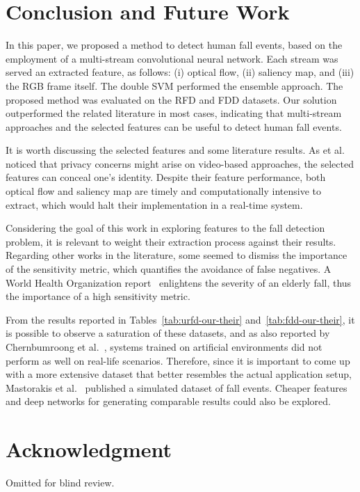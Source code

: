 \documentclass[conference]{IEEEtran}
\begin{document}
\section{Conclusion and Future Work}
\label{sec:conclusion}

In this paper, we proposed a method to detect human fall events, based on the employment of a multi-stream convolutional neural network. Each stream was served an extracted feature, as follows: (i) optical flow, (ii) saliency map, and (iii) the RGB frame itself. The double SVM performed the ensemble approach. The proposed method was evaluated on the RFD and FDD datasets. Our solution outperformed the related literature in most cases, indicating that multi-stream approaches and the selected features can be useful to detect human fall events.\par
It is worth discussing the selected features and some literature results. As et al.~\cite{chernbumroong2012elderly} noticed that privacy concerns might arise on video-based approaches, the selected features can conceal one's identity. Despite their feature performance, both optical flow and saliency map are timely and computationally intensive to extract, which would halt their implementation in a real-time system.\par
Considering the goal of this work in exploring features to the fall detection problem, it is relevant to weight their extraction process against their results. Regarding other works in the literature, some seemed to dismiss the importance of the sensitivity metric, which quantifies the avoidance of false negatives. A World Health Organization report~\cite{who2007report} enlightens the severity of an elderly fall, thus the importance of a high sensitivity metric.\par
From the results reported in Tables~\ref{tab:urfd-our-their} and~\ref{tab:fdd-our-their}, it is possible to observe a saturation of these datasets, and as also reported by Chernbumroong et al.~\cite{chernbumroong2012elderly}, systems trained on artificial environments did not perform as well on real-life scenarios. Therefore, since it is important to come up with a more extensive dataset that better resembles the actual application setup, Mastorakis et al.~\cite{mastorakis2018fall} published a simulated dataset of fall events. Cheaper features and deep networks for generating comparable results could also be explored.

\section*{Acknowledgment}

Omitted for blind review.




\end{document}

